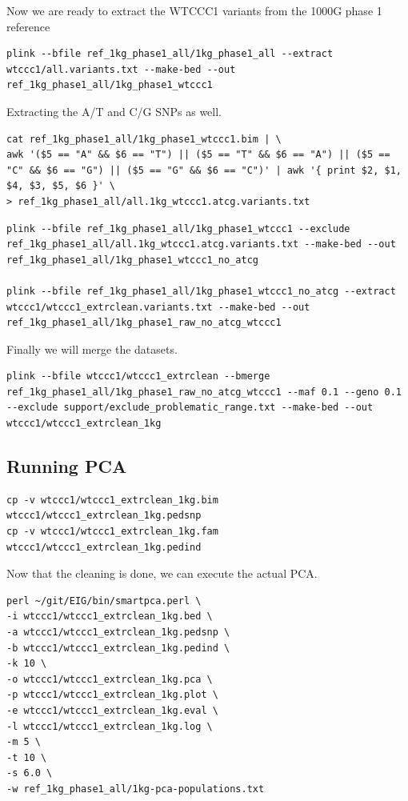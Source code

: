 \documentclass[
]{book}
\begin{document}
Now we are ready to extract the WTCCC1 variants from the 1000G phase 1 reference

\begin{lstlisting}
plink --bfile ref_1kg_phase1_all/1kg_phase1_all --extract wtccc1/all.variants.txt --make-bed --out ref_1kg_phase1_all/1kg_phase1_wtccc1
\end{lstlisting}

Extracting the A/T and C/G SNPs as well.

\begin{lstlisting}
cat ref_1kg_phase1_all/1kg_phase1_wtccc1.bim | \
awk '($5 == "A" && $6 == "T") || ($5 == "T" && $6 == "A") || ($5 == "C" && $6 == "G") || ($5 == "G" && $6 == "C")' | awk '{ print $2, $1, $4, $3, $5, $6 }' \
> ref_1kg_phase1_all/all.1kg_wtccc1.atcg.variants.txt
\end{lstlisting}

\begin{lstlisting}
plink --bfile ref_1kg_phase1_all/1kg_phase1_wtccc1 --exclude ref_1kg_phase1_all/all.1kg_wtccc1.atcg.variants.txt --make-bed --out ref_1kg_phase1_all/1kg_phase1_wtccc1_no_atcg

plink --bfile ref_1kg_phase1_all/1kg_phase1_wtccc1_no_atcg --extract wtccc1/wtccc1_extrclean.variants.txt --make-bed --out ref_1kg_phase1_all/1kg_phase1_raw_no_atcg_wtccc1
\end{lstlisting}

Finally we will merge the datasets.

\begin{lstlisting}
plink --bfile wtccc1/wtccc1_extrclean --bmerge ref_1kg_phase1_all/1kg_phase1_raw_no_atcg_wtccc1 --maf 0.1 --geno 0.1 --exclude support/exclude_problematic_range.txt --make-bed --out wtccc1/wtccc1_extrclean_1kg
\end{lstlisting}

\hypertarget{running-pca-1}{%
\subsection{Running PCA}\label{running-pca-1}}

\begin{lstlisting}
cp -v wtccc1/wtccc1_extrclean_1kg.bim wtccc1/wtccc1_extrclean_1kg.pedsnp
cp -v wtccc1/wtccc1_extrclean_1kg.fam wtccc1/wtccc1_extrclean_1kg.pedind
\end{lstlisting}

Now that the cleaning is done, we can execute the actual PCA.

\begin{lstlisting}
perl ~/git/EIG/bin/smartpca.perl \
-i wtccc1/wtccc1_extrclean_1kg.bed \
-a wtccc1/wtccc1_extrclean_1kg.pedsnp \
-b wtccc1/wtccc1_extrclean_1kg.pedind \
-k 10 \
-o wtccc1/wtccc1_extrclean_1kg.pca \
-p wtccc1/wtccc1_extrclean_1kg.plot \
-e wtccc1/wtccc1_extrclean_1kg.eval \
-l wtccc1/wtccc1_extrclean_1kg.log \
-m 5 \
-t 10 \
-s 6.0 \
-w ref_1kg_phase1_all/1kg-pca-populations.txt
\end{lstlisting}
\end{document}
